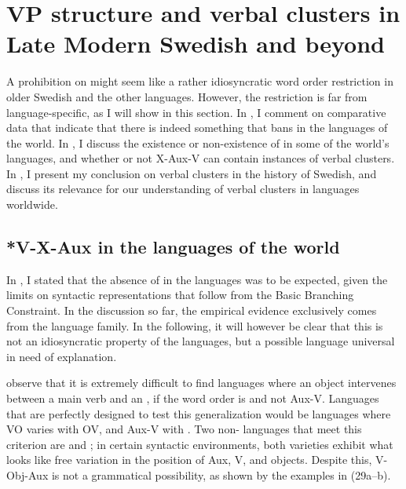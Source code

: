 \documentclass[output=paper, colorlinks, citecolor=brown]{langscibook}
\begin{document}
\section{VP structure and verbal clusters in Late Modern Swedish and beyond}\label{sec:sangfelt:5}

A prohibition on  might seem like a rather idiosyncratic word order restriction in older Swedish and the other  languages. However, the restriction is far from language-specific, as I will show in this section. In , I comment on comparative data that indicate that there is indeed something that bans  in the languages of the world. In , I discuss the existence or non-existence of  in some of the world’s languages, and whether or not X-Aux-V can contain instances of verbal clusters. In , I present my conclusion on verbal clusters in the history of Swedish, and discuss its relevance for our understanding of verbal clusters in languages worldwide.

\subsection{*V-X-Aux in the languages of the world}\label{sec:sangfelt:5.1}

In , I stated that the absence of  in the  languages was to be expected, given the limits on syntactic representations that follow from the Basic Branching Constraint. In the discussion so far, the empirical evidence exclusively comes from the  language family. In the following, it will however be clear that this is not an idiosyncratic property of the  languages, but a possible language universal in need of explanation.


\citet{BiberauerEtAl2014} observe that it is extremely difficult to find languages where an object intervenes between a main verb and an , if the word order is  and not Aux-V. Languages that are perfectly designed to test this generalization would be languages where VO varies with OV, and Aux-V with . Two non- languages that meet this criterion are  and ; in certain syntactic environments, both varieties exhibit what looks like free variation in the position of Aux, V, and objects. Despite this, V-Obj-Aux is not a grammatical possibility, as shown by the examples in (29a–b).
\end{document}
